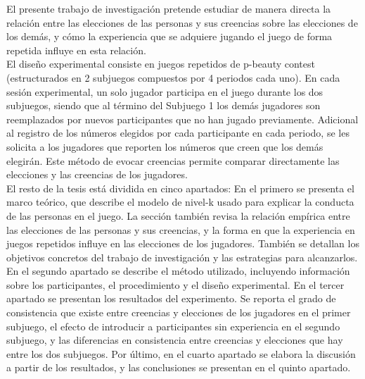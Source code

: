 El presente trabajo de investigación pretende estudiar de manera directa la relación entre las elecciones de las personas y sus creencias sobre las elecciones de los demás, y cómo la experiencia que se adquiere jugando el juego de forma repetida influye en esta relación.\\

El diseño experimental consiste en juegos repetidos de p-beauty contest (estructurados en 2 subjuegos compuestos por 4 periodos cada uno). En cada sesión experimental, un solo jugador participa en el juego durante los dos subjuegos, siendo que al término del Subjuego 1 los demás jugadores son reemplazados por nuevos participantes que no han jugado previamente. Adicional al registro de los números elegidos por cada participante en cada periodo, se les solicita a los jugadores que reporten los números que creen que los demás elegirán. Este método de evocar creencias permite comparar directamente las elecciones y las creencias de los jugadores.\\

El resto de la tesis está dividida en cinco apartados: En el primero se presenta el marco teórico, que describe el modelo de nivel-k usado para explicar la conducta de las personas en el juego. La sección también revisa la relación empírica entre las elecciones de las personas y sus creencias, y la forma en que la experiencia en juegos repetidos influye en las elecciones de los jugadores. También se detallan los objetivos concretos del trabajo de investigación y las estrategias para alcanzarlos. En el segundo apartado se describe el método utilizado, incluyendo información sobre los participantes, el procedimiento y el diseño experimental. En el tercer apartado se presentan los resultados del experimento. Se reporta el grado de consistencia que existe entre creencias y elecciones de los jugadores en el primer subjuego, el efecto de introducir a participantes sin experiencia en el segundo subjuego, y las diferencias en consistencia entre creencias y elecciones que hay entre los dos subjuegos. Por último, en el cuarto apartado se elabora la discusión a partir de los resultados, y las conclusiones se presentan en el quinto apartado.
